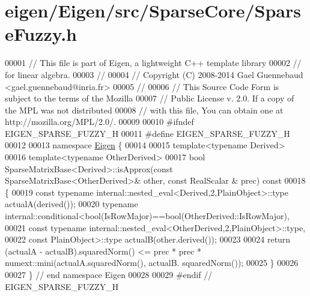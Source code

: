 \hypertarget{eigen_2_eigen_2src_2_sparse_core_2_sparse_fuzzy_8h_source}{}\section{eigen/\+Eigen/src/\+Sparse\+Core/\+Sparse\+Fuzzy.h}
\label{eigen_2_eigen_2src_2_sparse_core_2_sparse_fuzzy_8h_source}

\begin{DoxyCode}
00001 \textcolor{comment}{// This file is part of Eigen, a lightweight C++ template library}
00002 \textcolor{comment}{// for linear algebra.}
00003 \textcolor{comment}{//}
00004 \textcolor{comment}{// Copyright (C) 2008-2014 Gael Guennebaud <gael.guennebaud@inria.fr>}
00005 \textcolor{comment}{//}
00006 \textcolor{comment}{// This Source Code Form is subject to the terms of the Mozilla}
00007 \textcolor{comment}{// Public License v. 2.0. If a copy of the MPL was not distributed}
00008 \textcolor{comment}{// with this file, You can obtain one at http://mozilla.org/MPL/2.0/.}
00009 
00010 \textcolor{preprocessor}{#ifndef EIGEN\_SPARSE\_FUZZY\_H}
00011 \textcolor{preprocessor}{#define EIGEN\_SPARSE\_FUZZY\_H}
00012 
00013 \textcolor{keyword}{namespace }\hyperlink{namespace_eigen}{Eigen} \{
00014   
00015 \textcolor{keyword}{template}<\textcolor{keyword}{typename} Derived>
00016 \textcolor{keyword}{template}<\textcolor{keyword}{typename} OtherDerived>
00017 \textcolor{keywordtype}{bool} SparseMatrixBase<Derived>::isApprox(\textcolor{keyword}{const} SparseMatrixBase<OtherDerived>& other, \textcolor{keyword}{const} RealScalar &
      prec)\textcolor{keyword}{ const}
00018 \textcolor{keyword}{}\{
00019   \textcolor{keyword}{const} \textcolor{keyword}{typename} internal::nested\_eval<Derived,2,PlainObject>::type actualA(derived());
00020   \textcolor{keyword}{typename} internal::conditional<bool(IsRowMajor)==bool(OtherDerived::IsRowMajor),
00021     \textcolor{keyword}{const} \textcolor{keyword}{typename} internal::nested\_eval<OtherDerived,2,PlainObject>::type,
00022     \textcolor{keyword}{const} PlainObject>::type actualB(other.derived());
00023 
00024   \textcolor{keywordflow}{return} (actualA - actualB).squaredNorm() <= prec * prec * numext::mini(actualA.squaredNorm(), actualB.
      squaredNorm());
00025 \}
00026 
00027 \} \textcolor{comment}{// end namespace Eigen}
00028 
00029 \textcolor{preprocessor}{#endif // EIGEN\_SPARSE\_FUZZY\_H}
\end{DoxyCode}
